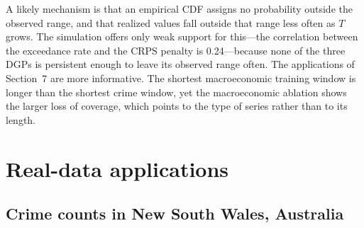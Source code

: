 \documentclass[11pt]{article}
\begin{document}
A likely mechanism is that an empirical CDF assigns no probability outside the
observed range, and that realized values fall outside that range less often as
$T$ grows. The simulation offers only weak support for this---the correlation
between the exceedance rate and the CRPS penalty is 0.24---because none of the
three DGPs is persistent enough to leave its observed range often. The
applications of Section~7 are more informative. The shortest macroeconomic
training window is longer than the shortest crime window, yet the macroeconomic
ablation shows the larger loss of coverage, which points to the type of series
rather than to its length.

\setcounter{section}{6}
\section{Real-data applications}

\subsection{Crime counts in New South Wales, Australia}
\end{document}
